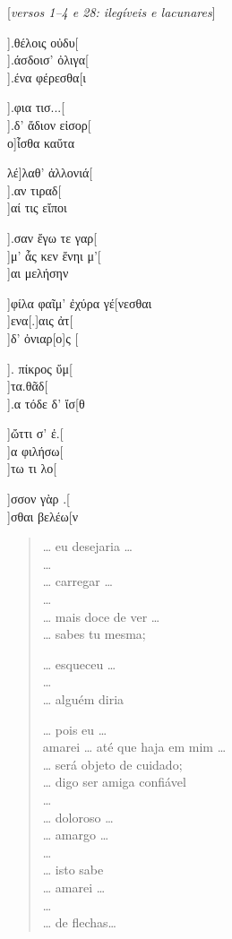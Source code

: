 \begin{gkverse}
\textnormal{[\textit{versos 1--4 e 28: ilegíveis e lacunares}]}

].θέλοις οὐδυ[\\
].άσδοισ’ ὀλιγα[\\
].ένα φέρεσθα[ι

  ].φια τισ...[\\
  ].δ’ ἄδιον εἰσορ[\\
ο]ἶσθα καὔτα

λέ]λαθ’ ἀλλονιά[\\
     ].αν τιραδ[\\
     ]αί τις εἴποι

].σαν ἔγω τε γαρ[\\
]μ’ ἆς κεν ἔνηι μ’[\\
  ]αι μελήσην

]φίλα φαῖμ’ ἐχύρα γέ[νεσθαι\\
   ]ενα[.]αις ἀτ[\\
          ]δ’ ὀνιαρ[ο]ς [

        ]. πίκρος ὔμ[\\
        ]τα.θᾶδ[\\
        ].α τόδε δ’ ἴσ[θ

       ]ὤττι σ’ ἐ.[\\
]α φιλήσω[\\
]τω τι λο[

]σσον γὰρ .[\\
          ]σθαι βελέω[ν
\end{gkverse}

\pagebreak
\begin{verse}
\ldots{} eu desejaria \ldots{}\\
\ldots{}\\
\ldots{} carregar \ldots{}\\
\ldots{}\\
\ldots{} mais doce de ver \ldots{}\\
\ldots{} sabes tu mesma;

\ldots{} esqueceu \ldots{}\\ 
\ldots{}\\
\ldots{} alguém diria

\ldots{} pois eu \ldots{}\\
amarei \ldots{} até que haja em mim \ldots{}\\
\ldots{} será objeto de cuidado;\\
\ldots{} digo ser amiga confiável \\
\ldots{}\\
\ldots{} doloroso \ldots{}\\
\ldots{} amargo \ldots{}\\
\ldots{}\\
\ldots{} isto sabe\\
\ldots{} amarei \ldots{}\\
\ldots{}\\
\ldots{} de flechas\ldots{}
\end{verse}

